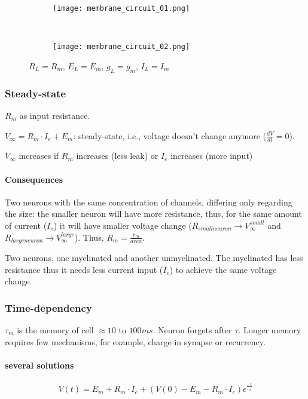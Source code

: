 \documentclass[main]{subfiles}
\begin{document}
\begin{figure}[H]
	\centering
	\begin{subfigure}[b]{0.3\textwidth}
		\centering
		\texttt{[image: membrane\_circuit\_01.png]}
	\end{subfigure}%
	~
	\begin{subfigure}[b]{0.5\textwidth}
		\centering
		\texttt{[image: membrane\_circuit\_02.png]}
	\end{subfigure}
	\caption{$R_L = R_m$, $E_L = E_m$, $g_L = g_m$, $I_L = I_m$}
\end{figure}

\subsubsection{Steady-state}
$R_m$ as input resistance.

$V_\infty = R_m \cdot I_e + E_m$: steady-state, i.e., voltage doesn't change anymore ($\frac{dV}{dt}=0$).

$V_\infty$ increases if $R_m$ increases (less leak) or $I_e$ increases (more input)

\paragraph{Consequences}
Two neurons with the same concentration of channels, differing only regarding the size: the smaller neuron will have more resistance, thus, for the same amount of current ($I_e$) it will have smaller voltage change ($R_{small neuron} \rightarrow V^{small}_\infty$ and $R_{large neuron} \rightarrow V^{large}_\infty$). Thus, $R_m = \frac{r_m}{area}$.

Two neurons, one myelinated and another unmyelinated. The myelinated has less resistance thus it needs less current input ($I_e$) to achieve the same voltage change.

\subsubsection{Time-dependency}
$\tau_m$ is the memory of cell $\approx 10$ to $100 ms$. Neuron forgets after $\tau$. Longer memory requires few mechanisms, for example, charge in synapse or recurrency.

\paragraph{several solutions}
\[V(t) = E_m + R_m \cdot I_e + (V(0) - E_m - R_m \cdot I_e) \epsilon^{\frac{-t}{\tau_m}}\]
\end{document}
